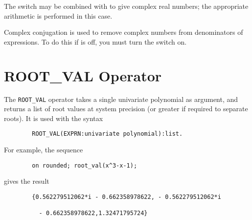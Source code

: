 The switch  may be combined with  to give complex
real numbers; the appropriate arithmetic is performed in this case.

\hypertarget{switch:RATIONALIZE}{}
Complex conjugation is used to remove complex numbers from denominators of
expressions.  To do this if  is off, you must turn the switch
 on.

\section{ROOT\_VAL Operator}
\hypertarget{operator:ROOT_VAL}{}

The \texttt{ROOT\_VAL}  operator takes a single univariate polynomial as
argument, and returns a list of root values at system precision (or
greater if required to separate roots).  It is used with the syntax
\begin{verbatim}
        ROOT_VAL(EXPRN:univariate polynomial):list.
\end{verbatim}
For example, the sequence
\begin{verbatim}
        on rounded; root_val(x^3-x-1);
\end{verbatim}
gives the result
\begin{verbatim}
        {0.562279512062*i - 0.662358978622, - 0.562279512062*i

          - 0.662358978622,1.32471795724}
\end{verbatim}

